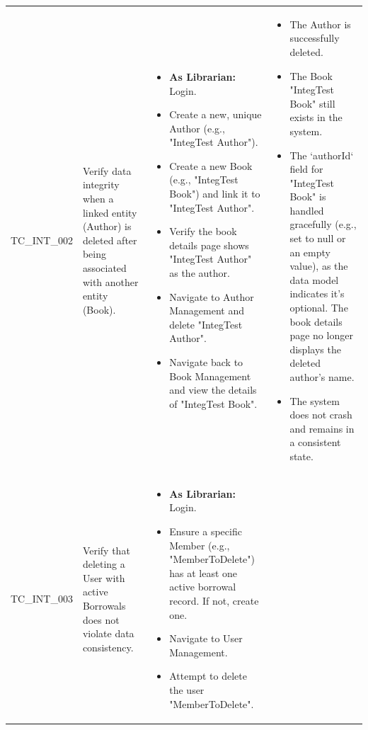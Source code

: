 \begin{longtable}{|>{\scriptsize\raggedright\arraybackslash}p{2cm}|>{\raggedright\arraybackslash}p{4cm}|>{\raggedright\arraybackslash}p{5cm}|>{\raggedright\arraybackslash}p{4.5cm}|}
\multicolumn{4}{|l|}{\textbf{Scenario: Data Integrity and Referential Constraints}} \\ \hline
TC\_INT\_002 & Verify data integrity when a linked entity (Author) is deleted after being associated with another entity (Book). & 
    \begin{itemize}[noitemsep, topsep=0pt, partopsep=0pt, leftmargin=*]
        \item \textbf{As Librarian:} Login.
        \item Create a new, unique Author (e.g., "IntegTest Author").
        \item Create a new Book (e.g., "IntegTest Book") and link it to "IntegTest Author".
        \item Verify the book details page shows "IntegTest Author" as the author.
        \item Navigate to Author Management and delete "IntegTest Author".
        \item Navigate back to Book Management and view the details of "IntegTest Book".
    \end{itemize} & 
    \begin{itemize}[noitemsep, topsep=0pt, partopsep=0pt, leftmargin=*]
        \item The Author is successfully deleted.
        \item The Book "IntegTest Book" still exists in the system.
        \item The `authorId` field for "IntegTest Book" is handled gracefully (e.g., set to null or an empty value), as the data model indicates it's optional. The book details page no longer displays the deleted author's name.
        \item The system does not crash and remains in a consistent state.
    \end{itemize} \\ \hline
TC\_INT\_003 & Verify that deleting a User with active Borrowals does not violate data consistency. &
    \begin{itemize}[noitemsep, topsep=0pt, partopsep=0pt, leftmargin=*]
        \item \textbf{As Librarian:} Login.
        \item Ensure a specific Member (e.g., "MemberToDelete") has at least one active borrowal record. If not, create one.
        \item Navigate to User Management.
        \item Attempt to delete the user "MemberToDelete".

\end{itemize}
\end{longtable}

